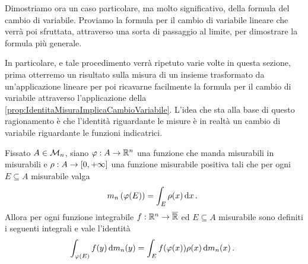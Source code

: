 Dimostriamo ora un caso particolare, ma molto significativo, della formula del cambio di variabile. 
Proviamo la formula per il cambio di variabile lineare che verrà poi sfruttata, attraverso una sorta di passaggio al limite, per dimostrare la formula più generale.

In particolare, e tale procedimento verrà ripetuto varie volte in questa sezione, prima otterremo un risultato sulla misura di un insieme trasformato da un'applicazione lineare per poi ricavarne facilmente la formula per il cambio di variabile attraverso l'applicazione della \cref{prop:IdentitaMisuraImplicaCambioVariabile}. L'idea che sta alla base di questo ragionamento è che l'identità riguardante le misure è in realtà un cambio di variabile riguardante le funzioni indicatrici.

\begin{proposition}\label{prop:IdentitaMisuraImplicaCambioVariabile}
	Fissato $A\in\mathcal M_n$, siano $\varphi:A\to\mathbb R^n$ una funzione che manda misurabili in misurabili e $\rho:A\to[0,+\infty]$ una funzione misurabile positiva tali che per ogni $E\subseteq A$ misurabile valga
	\begin{equation*}
		m_n\left(\varphi(E)\right)=\int_E\rho(x)\,\mathrm d x \, \text{. }
	\end{equation*}
	Allora per ogni funzione integrabile $f:\mathbb R^n\to\overline{\mathbb R}$ ed $E\subseteq A$ misurabile sono definiti i seguenti integrali e vale l'identità
	\begin{equation*}
		\int_{\varphi(E)}f(y)\,\mathrm d m_n(y)=\int_E f(\varphi(x))\rho(x)\,\mathrm d m_n(x)\, \text{. }
	\end{equation*}
\end{proposition}
